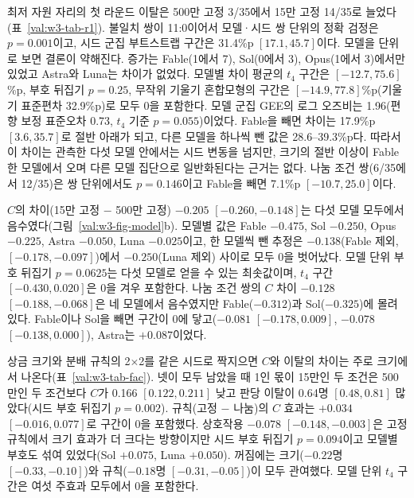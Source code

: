 최저 자원 자리의 첫 라운드 이탈은 500만 고정 3/35에서 15만 고정 14/35로 늘었다(표~\ref{val:w3-tab-r1}). 불일치 쌍이 11:0이어서 모델·시드 쌍 단위의 정확 검정은 $p=0.001$이고, 시드 군집 부트스트랩 구간은 31.4\%p $[17.1, 45.7]$이다. 모델을 단위로 보면 결론이 약해진다. 증가는 Fable(1에서 7), Sol(0에서 3), Opus(1에서 3)에서만 있었고 Astra와 Luna는 차이가 없었다. 모델별 차이 평균의 $t_4$ 구간은 $[-12.7, 75.6]$\%p, 부호 뒤집기 $p=0.25$, 무작위 기울기 혼합모형의 구간은 $[-14.9, 77.8]$\%p(기울기 표준편차 32.9\%p)로 모두 0을 포함한다. 모델 군집 GEE의 로그 오즈비는 1.96(편향 보정 표준오차 0.73, $t_4$ 기준 $p=0.055$)이었다. Fable을 빼면 차이는 17.9\%p $[3.6, 35.7]$로 절반 아래가 되고, 다른 모델을 하나씩 뺀 값은 28.6--39.3\%p다. 따라서 이 차이는 관측한 다섯 모델 안에서는 시드 변동을 넘지만, 크기의 절반 이상이 Fable 한 모델에서 오며 다른 모델 집단으로 일반화된다는 근거는 없다. 나눔 조건 쌍(6/35에서 12/35)은 쌍 단위에서도 $p=0.146$이고 Fable을 빼면 7.1\%p $[-10.7, 25.0]$이다.

$C$의 차이(15만 고정 $-$ 500만 고정) $-0.205$ $[-0.260, -0.148]$는 다섯 모델 모두에서 음수였다(그림~\ref{val:w3-fig-model}b). 모델별 값은 Fable $-0.475$, Sol $-0.250$, Opus $-0.225$, Astra $-0.050$, Luna $-0.025$이고, 한 모델씩 뺀 추정은 $-0.138$(Fable 제외, $[-0.178, -0.097]$)에서 $-0.250$(Luna 제외) 사이로 모두 0을 벗어났다. 모델 단위 부호 뒤집기 $p=0.0625$는 다섯 모델로 얻을 수 있는 최솟값이며, $t_4$ 구간 $[-0.430, 0.020]$은 0을 겨우 포함한다. 나눔 조건 쌍의 $C$ 차이 $-0.128$ $[-0.188, -0.068]$은 네 모델에서 음수였지만 Fable($-0.312$)과 Sol($-0.325$)에 몰려 있다. Fable이나 Sol을 빼면 구간이 0에 닿고($-0.081$ $[-0.178, 0.009]$, $-0.078$ $[-0.138, 0.000]$), Astra는 $+0.087$이었다.

상금 크기와 분배 규칙의 2$\times$2를 같은 시드로 짝지으면 $C$와 이탈의 차이는 주로 크기에서 나온다(표~\ref{val:w3-tab-fac}). 넷이 모두 남았을 때 1인 몫이 15만인 두 조건은 500만인 두 조건보다 $C$가 0.166 $[0.122, 0.211]$ 낮고 판당 이탈이 0.64명 $[0.48, 0.81]$ 많았다(시드 부호 뒤집기 $p=0.002$). 규칙(고정 $-$ 나눔)의 $C$ 효과는 $+0.034$ $[-0.016, 0.077]$로 구간이 0을 포함했다. 상호작용 $-0.078$ $[-0.148, -0.003]$은 고정 규칙에서 크기 효과가 더 크다는 방향이지만 시드 부호 뒤집기 $p=0.094$이고 모델별 부호도 섞여 있었다(Sol $+0.075$, Luna $+0.050$). 꺼짐에는 크기($-0.22$명 $[-0.33, -0.10]$)와 규칙($-0.18$명 $[-0.31, -0.05]$)이 모두 관여했다. 모델 단위 $t_4$ 구간은 여섯 주효과 모두에서 0을 포함한다.

